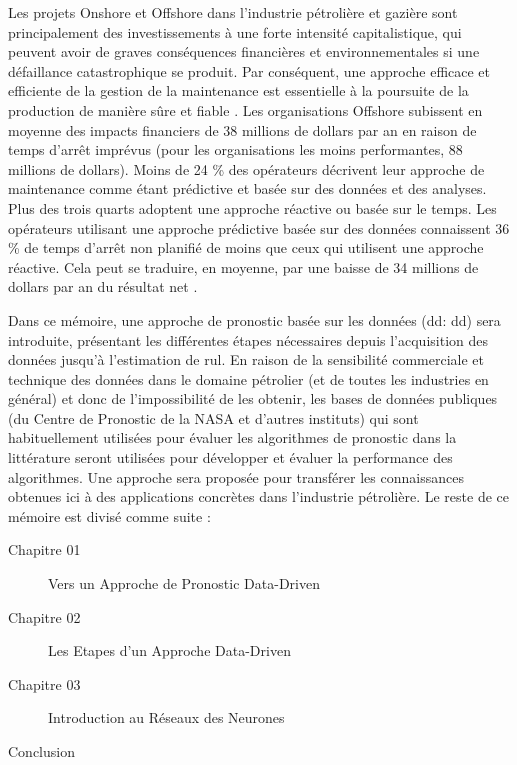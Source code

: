 Les projets Onshore et Offshore dans l'industrie pétrolière et gazière sont principalement des investissements à une forte intensité capitalistique, qui peuvent avoir de graves conséquences financières et environnementales si une défaillance catastrophique se produit. Par conséquent, une approche efficace et efficiente de la gestion de la maintenance est essentielle à la poursuite de la production de manière sûre et fiable \cite{Telford2011}. Les organisations Offshore subissent en moyenne des impacts financiers de 38 millions de dollars par an en raison de temps d'arrêt imprévus (pour les organisations les moins performantes, 88 millions de dollars). Moins de 24 \% des opérateurs décrivent leur approche de maintenance comme étant prédictive et basée sur des données et des analyses. Plus des trois quarts adoptent une approche réactive ou basée sur le temps. Les opérateurs utilisant une approche prédictive basée sur des données connaissent 36 \% de temps d'arrêt non planifié de moins que ceux qui utilisent une approche réactive. Cela peut se traduire, en moyenne, par une baisse de 34 millions de dollars par an du résultat net \cite{Eriksen2016}.

Dans ce mémoire, une approche de pronostic basée sur les données (\acrlong{dd}: \acrshort{dd}) sera introduite, présentant les différentes étapes nécessaires depuis l'acquisition des données jusqu'à l'estimation de \acrshort{rul}. En raison de la sensibilité commerciale et technique des données dans le domaine pétrolier (et de toutes les industries en général) et donc de l'impossibilité de les obtenir, les bases de données publiques (du Centre de Pronostic de la NASA et d'autres instituts) qui sont habituellement utilisées pour évaluer les algorithmes de pronostic dans la littérature seront utilisées pour développer et évaluer la performance des algorithmes. Une approche sera proposée pour transférer les connaissances obtenues ici à des applications concrètes dans l'industrie pétrolière.
\newline
Le reste de ce mémoire est divisé comme suite :
\begin{description}
	\item[Chapitre 01] Vers un Approche de Pronostic Data-Driven
	\item[Chapitre 02] Les Etapes d'un Approche Data-Driven
	\item[Chapitre 03] Introduction au Réseaux des Neurones  
	\item[Conclusion] 
\end{description}




